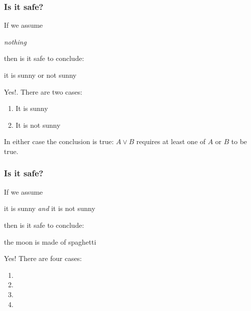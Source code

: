 \documentclass[xetex,aspectratio=169,14pt,hyperref={pdfpagelabels=true,pdflang={en-GB}}]{beamer}
\begin{document}
\begin{frame}[t]
  \frametitle{Is it safe?}

  If we assume
  \begin{center}
    \emph{nothing}
  \end{center}
  then is it safe to conclude:
  \begin{center}
    it is sunny or not sunny
  \end{center}

  \pause
  \bigskip

  Yes!. There are two cases:
  \begin{enumerate}
  \item It is sunny
  \item It is not sunny
  \end{enumerate}
  \pause In either case the conclusion is true: $A \lor B$ requires at
  least one of $A$ or $B$ to be true.
\end{frame}

\begin{frame}[t]
  \frametitle{Is it safe?}

  If we assume
  \begin{center}
    it is sunny \qquad \emph{and} \qquad it is not sunny
  \end{center}
  then is it safe to conclude:
  \begin{center}
    the moon is made of spaghetti
  \end{center}

  \pause
  \bigskip

  Yes! \pause There are four cases:
  \begin{enumerate}
  \item {}
  \item {}
  \item {}
  \item {}
  \end{enumerate}
  \pause\pause
\end{frame}
\end{document}
